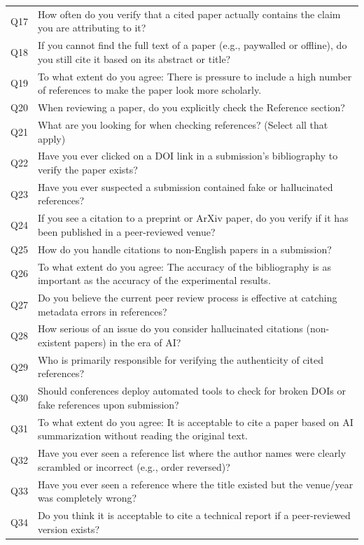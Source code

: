 \begin{table}[htbp]
\begin{threeparttable}
\begin{tabular}{p{1.2cm}p{14.2cm}}
Q17 & How often do you verify that a cited paper actually contains the claim you are attributing to it? \\
Q18 & If you cannot find the full text of a paper (e.g., paywalled or offline), do you still cite it based on its abstract or title? \\
Q19 & To what extent do you agree: There is pressure to include a high number of references to make the paper look more scholarly. \\
Q20 & When reviewing a paper, do you explicitly check the Reference section? \\
Q21 & What are you looking for when checking references? (Select all that apply) \\
Q22 & Have you ever clicked on a DOI link in a submission's bibliography to verify the paper exists? \\
Q23 & Have you ever suspected a submission contained fake or hallucinated references? \\
Q24 & If you see a citation to a preprint or ArXiv paper, do you verify if it has been published in a peer-reviewed venue? \\
Q25 & How do you handle citations to non-English papers in a submission? \\
Q26 & To what extent do you agree: The accuracy of the bibliography is as important as the accuracy of the experimental results. \\
Q27 & Do you believe the current peer review process is effective at catching metadata errors in references? \\
Q28 & How serious of an issue do you consider hallucinated citations (non-existent papers) in the era of AI? \\
Q29 & Who is primarily responsible for verifying the authenticity of cited references? \\
Q30 & Should conferences deploy automated tools to check for broken DOIs or fake references upon submission? \\
Q31 & To what extent do you agree: It is acceptable to cite a paper based on AI summarization without reading the original text. \\
Q32 & Have you ever seen a reference list where the author names were clearly scrambled or incorrect (e.g., order reversed)? \\
Q33 & Have you ever seen a reference where the title existed but the venue/year was completely wrong? \\
Q34 & Do you think it is acceptable to cite a technical report if a peer-reviewed version exists? \\

\end{tabular}
\end{threeparttable}
\end{table}
